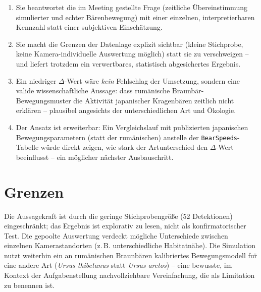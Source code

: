 \documentclass[11pt,a4paper]{article}
\begin{document}
\begin{enumerate}
  \item Sie beantwortet die im Meeting gestellte Frage (zeitliche
        \"Ubereinstimmung simulierter und echter B\"arenbewegung) mit einer
        einzelnen, interpretierbaren Kennzahl statt einer subjektiven
        Einsch\"atzung.
  \item Sie macht die Grenzen der Datenlage explizit sichtbar (kleine
        Stichprobe, keine Kamera-individuelle Auswertung m\"oglich) statt sie
        zu verschweigen -- und liefert trotzdem ein verwertbares, statistisch
        abgesichertes Ergebnis.
  \item Ein niedriger $\Delta$-Wert w\"are \emph{kein} Fehlschlag der
        Umsetzung, sondern eine valide wissenschaftliche Aussage: dass
        rum\"anische Braunb\"ar-Bewegungsmuster die Aktivit\"at japanischer
        Kragenb\"aren zeitlich nicht erkl\"aren -- plausibel angesichts der
        unterschiedlichen Art und \"Okologie.
  \item Der Ansatz ist erweiterbar: Ein Vergleichslauf mit publizierten
        japanischen Bewegungsparametern (statt der rum\"anischen) anstelle der
        \texttt{BearSpeeds}-Tabelle w\"urde direkt zeigen, wie stark der
        Artunterschied den $\Delta$-Wert beeinflusst -- ein m\"oglicher
        n\"achster Ausbauschritt.
\end{enumerate}

\section{Grenzen}

Die Aussagekraft ist durch die geringe Stichprobengr\"o{\ss}e (52 Detektionen)
eingeschr\"ankt; das Ergebnis ist explorativ zu lesen, nicht als
konfirmatorischer Test. Die gepoolte Auswertung verdeckt m\"ogliche
Unterschiede zwischen einzelnen Kamerastandorten (z.\,B. unterschiedliche
Habitatn\"ahe). Die Simulation nutzt weiterhin ein an rum\"anischen
Braunb\"aren kalibriertes Bewegungsmodell fu\"r eine andere Art
(\emph{Ursus thibetanus} statt \emph{Ursus arctos}) -- eine bewusste, im
Kontext der Aufgabenstellung nachvollziehbare Vereinfachung, die als
Limitation zu benennen ist.
\end{document}
